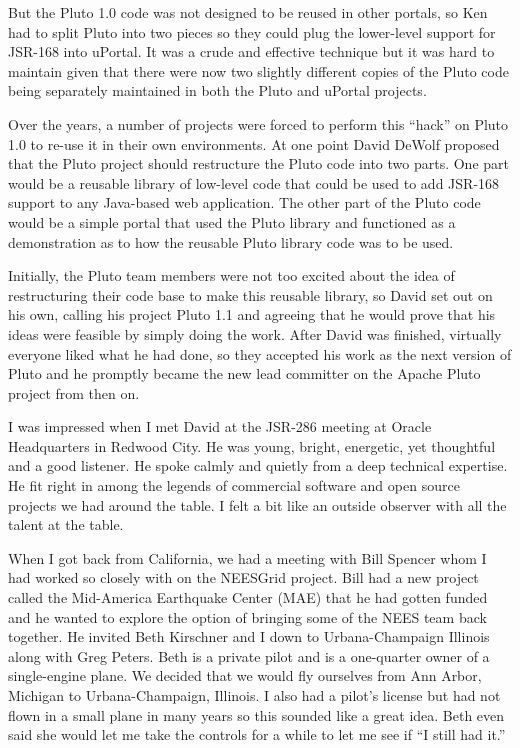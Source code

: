 \documentclass[12pt]{book}
\begin{document}
But the Pluto 1.0 code was not designed to be reused in other portals, so
Ken had to split Pluto into two pieces so they could plug the
lower-level support for JSR-168 into uPortal.  It was a crude and effective
technique but it was hard to maintain given that there
were now two slightly different copies of the Pluto code being separately
maintained in both the Pluto and uPortal projects.

Over the years, a number of projects were forced to perform this ``hack'' on Pluto
1.0 to re-use it in their own environments.  At one point David DeWolf proposed
that the Pluto project should restructure the Pluto code into two parts.  One part
would be a reusable library of low-level code that could be used to
add JSR-168 support to any Java-based web application.
The other part of the Pluto code would be a simple
portal that used the Pluto library and functioned as a demonstration as
to how the reusable Pluto library code was to be used.

Initially, the Pluto team members were not too excited about the idea of
restructuring their code base to make this reusable library,
so David set out on his own, calling his project Pluto 1.1 and agreeing
that he would prove that his ideas were feasible by simply doing the work.
After David was finished, virtually everyone liked what he had
done, so they accepted his work as the next version of Pluto and
he promptly became the new lead committer on the Apache Pluto project
from then on.

I was impressed when I met David at the JSR-286 meeting at Oracle 
Headquarters in Redwood City.
He was young, bright, energetic, yet
thoughtful and a good listener.
He spoke calmly and quietly from a deep technical expertise.  He fit right
in among the legends of commercial software and open source
projects we had around the table.  I felt a bit like an outside observer
with all the talent at the table.


When I got back from California, we had a meeting with Bill Spencer
whom I had worked so closely with on the NEESGrid project.  Bill
had a new project called the Mid-America Earthquake Center (MAE)
that he had gotten funded and he wanted to explore the option
of bringing some of the NEES team back
together.   He invited Beth Kirschner and I down to Urbana-Champaign Illinois
along with Greg Peters.  Beth is a private pilot and is a one-quarter owner of a
single-engine plane.   We decided that we would fly ourselves
from Ann Arbor, Michigan to Urbana-Champaign, Illinois.   I also had a pilot's
license but had not flown in a small plane in many years so this
sounded like a great idea.   Beth even said she would let me take the
controls for a while to let me see if ``I still had it.''
\end{document}
